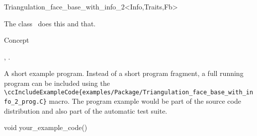 

\begin{ccRefClass}{Triangulation_face_base_with_info_2<Info,Traits,Fb>}  %


\ccDefinition
  
The class \ccRefName\ does this and that.


\ccIsModel

Concept

\ccTypes


\ccCreation
{}  %


\ccOperations


\ccSeeAlso

,
.

\ccExample

A short example program.
Instead of a short program fragment, a full running program can be
included using the 
\verb|\ccIncludeExampleCode{examples/Package/Triangulation_face_base_with_info_2_prog.C}| 
macro. The program example would be part of the source code distribution and
also part of the automatic test suite.

\begin{ccExampleCode}
void your_example_code() {
}
\end{ccExampleCode}


\end{ccRefClass}



